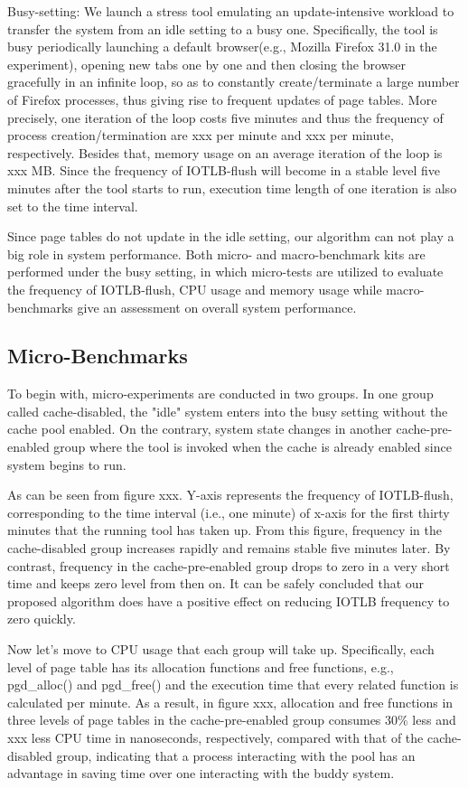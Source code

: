 \documentclass[letterpaper,twocolumn,10pt]{article}
\begin{document}
Busy-setting: We launch a stress tool emulating an update-intensive workload to transfer the system from an idle setting to a busy one. Specifically, the tool is busy periodically launching a default browser(e.g., Mozilla Firefox 31.0 in the experiment), opening new tabs one by one and then closing the browser gracefully in an infinite loop, so as to constantly create/terminate a large number of Firefox processes, thus giving rise to frequent updates of page tables. More precisely, one iteration of the loop costs five minutes and thus the frequency of process creation/termination are xxx per minute and xxx per minute, respectively. Besides that, memory usage on an average iteration of the loop is xxx MB. Since the frequency of IOTLB-flush will become in a stable level five minutes after the tool starts to run, execution time length of one iteration is also set to the time interval.

Since page tables do not update in the idle setting, our algorithm can not play a big role in system performance. Both micro- and macro-benchmark kits are performed under the busy setting, in which micro-tests are utilized to evaluate the frequency of IOTLB-flush, CPU usage and memory usage while macro-benchmarks give an assessment on overall system performance.

\subsection{Micro-Benchmarks}

To begin with, micro-experiments are conducted in two groups. In one group called cache-disabled, the "idle" system enters into the busy setting without the cache pool enabled. On the contrary, system state changes in another cache-pre-enabled group where the tool is invoked when the cache is already enabled since system begins to run.

As can be seen from figure xxx. Y-axis represents the frequency of IOTLB-flush, corresponding to the time interval (i.e., one minute) of x-axis for the first thirty minutes that the running tool has taken up. From this figure, frequency in the cache-disabled group increases rapidly and remains stable five minutes later. By contrast, frequency in the cache-pre-enabled group drops to zero in a very short time and keeps zero level from then on. It can be safely concluded that our proposed algorithm does have a positive effect on reducing IOTLB frequency to zero quickly.

Now let’s move to CPU usage that each group will take up. Specifically, each level of page table has its allocation functions and free functions, e.g., pgd\_alloc() and pgd\_free() and the execution time that every related function is calculated per minute. As a result, in figure xxx, allocation and free functions in three levels of page tables in the cache-pre-enabled group consumes 30\% less and xxx less CPU time in nanoseconds, respectively, compared with that of the cache-disabled group, indicating that a process interacting with the pool has an advantage in saving time over one interacting with the buddy system.
\end{document}
